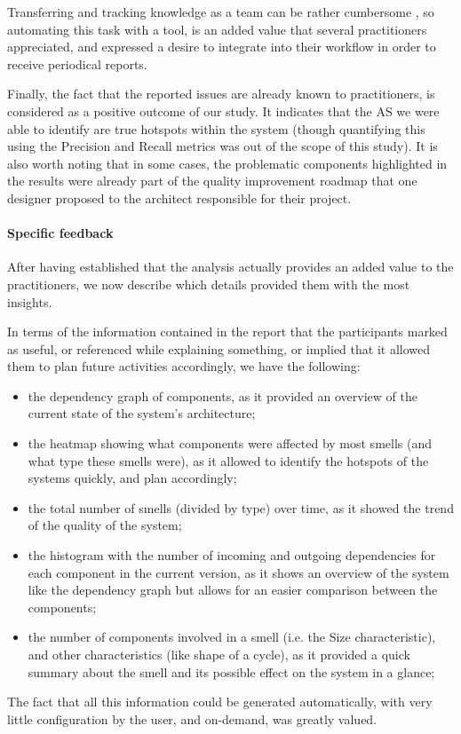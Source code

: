 Transferring and tracking knowledge as a team can be rather cumbersome \cite{Rus2002}, so automating this task with a tool, is an added value that several practitioners appreciated, and expressed a desire to integrate into their workflow in order to receive periodical reports.

Finally, the fact that the reported issues are already known to practitioners, is considered as a positive outcome of our study. It indicates that the AS we were able to identify are true hotspots within the system (though quantifying this using the Precision and Recall metrics was out of the scope of this study).
It is also worth noting that in some cases, the problematic components highlighted in the results were already part of the quality improvement roadmap that one designer proposed to the architect responsible for their project. 

\paragraph{Specific feedback}
After having established that the analysis actually provides an added value to the practitioners, we now describe which details provided them with the most insights.

In terms of the information contained in the report that the participants marked as useful, or referenced while explaining something, or implied that it allowed them to plan future activities accordingly, we have the following:
\begin{itemize}
    \item the dependency graph of components, as it provided an overview of the current state of the system's architecture;
    \item the heatmap showing what components were affected by most smells (and what type these smells were), as it allowed to identify the hotspots of the systems quickly, and plan accordingly;
    \item the total number of smells (divided by type) over time, as it showed the trend of the quality of the system;
    \item the histogram with the number of incoming and outgoing dependencies for each component in the current version, as it shows an overview of the system like the dependency graph but allows for an easier comparison between the components;
    \item the number of components involved in a smell (i.e. the Size characteristic), and other characteristics (like shape of a cycle), as it provided a quick summary about the smell and its possible effect on the system in a glance;
\end{itemize}
The fact that all this information could be generated automatically, with very little configuration by the user, and on-demand, was greatly valued.

